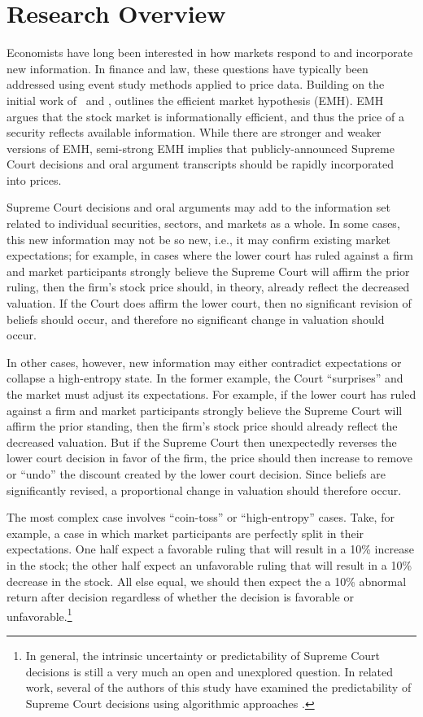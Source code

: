 \documentclass[preprint,12pt]{elsarticle}
\begin{document}
\section{Research Overview}
\label{S:2}
Economists have long been interested in how markets respond to and incorporate new information. In finance and law, these questions have typically been addressed using event study methods applied to price data.  Building on the initial work of \cite{bachelier1900theorie}\ and \cite{cootner1964random}, \cite{fama1970efficient} outlines the efficient market hypothesis (EMH). EMH argues that the stock market is informationally efficient, and thus the price of a security reflects available information.  While there are stronger and weaker versions of EMH, semi-strong EMH implies that publicly-announced Supreme Court decisions and oral argument transcripts should be rapidly incorporated into prices.  

Supreme Court decisions and oral arguments may add to the information set related to individual securities, sectors, and markets as a whole.  In some cases, this new information may not be so new, i.e., it may confirm existing market expectations; for example, in cases where the lower court has ruled against a firm and market participants strongly believe the Supreme Court will affirm the prior ruling, then the firm's stock price should, in theory, already reflect the decreased valuation.  If the Court does affirm the lower court, then no significant revision of beliefs should occur, and therefore no significant change in valuation should occur.

In other cases, however, new information may either contradict expectations or collapse a high-entropy state.  In the former example, the Court ``surprises'' and the market must adjust its expectations.  For example, if the lower court has ruled against a firm and market participants strongly believe the Supreme Court will affirm the prior standing, then the firm's stock price should already reflect the decreased valuation.  But if the Supreme Court then unexpectedly reverses the lower court decision in favor of the firm, the price should then increase to remove or ``undo'' the discount created by the lower court decision.  Since beliefs are significantly revised, a proportional change in valuation should therefore occur.

The most complex case involves ``coin-toss'' or ``high-entropy'' cases.  Take, for example, a case in which market participants are perfectly split in their expectations.  One half expect a favorable ruling that will result in a 10\% increase in the stock; the other half expect an unfavorable ruling that will result in a 10\% decrease in the stock.  All else equal, we should then expect the a 10\% abnormal return after decision regardless of whether the decision is favorable or unfavorable.\footnote{In general, the intrinsic uncertainty or predictability of Supreme Court decisions is still a very much an open and unexplored question.  In related work, several of the authors of this study have examined the predictability of Supreme Court decisions using algorithmic approaches \cite{katz2017general}.}
  
\end{document}

